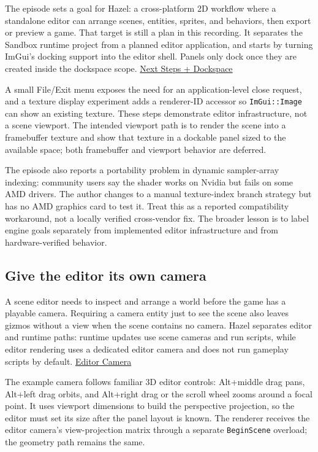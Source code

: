 The episode sets a goal for Hazel: a cross-platform 2D workflow where a standalone editor can arrange scenes, entities, sprites, and behaviors, then export or preview a game. That target is still a plan in this recording. It separates the Sandbox runtime project from a planned editor application, and starts by turning ImGui's docking support into the editor shell. Panels only dock once they are created inside the dockspace scope. \href{https://www.youtube.com/watch?v=UljMVrQ_zYY}{Next Steps + Dockspace}

A small File/Exit menu exposes the need for an application-level close request, and a texture display experiment adds a renderer-ID accessor so \texttt{ImGui::Image} can show an existing texture. These steps demonstrate editor infrastructure, not a scene viewport. The intended viewport path is to render the scene into a framebuffer texture and show that texture in a dockable panel sized to the available space; both framebuffer and viewport behavior are deferred.

The episode also reports a portability problem in dynamic sampler-array indexing: community users say the shader works on Nvidia but fails on some AMD drivers. The author changes to a manual texture-index branch strategy but has no AMD graphics card to test it. Treat this as a reported compatibility workaround, not a locally verified cross-vendor fix. The broader lesson is to label engine goals separately from implemented editor infrastructure and from hardware-verified behavior.

\subsection{Give the editor its own camera}\label{06-engine-ii-ch032-give-the-editor-its-own-camera}

A scene editor needs to inspect and arrange a world before the game has a playable camera. Requiring a camera entity just to see the scene also leaves gizmos without a view when the scene contains no camera. Hazel separates editor and runtime paths: runtime updates use scene cameras and run scripts, while editor rendering uses a dedicated editor camera and does not run gameplay scripts by default. \href{https://www.youtube.com/watch?v=8zVtRpBTwe0}{Editor Camera}

The example camera follows familiar 3D editor controls: Alt+middle drag pans, Alt+left drag orbits, and Alt+right drag or the scroll wheel zooms around a focal point. It uses viewport dimensions to build the perspective projection, so the editor must set its size after the panel layout is known. The renderer receives the editor camera's view-projection matrix through a separate \texttt{BeginScene} overload; the geometry path remains the same.

